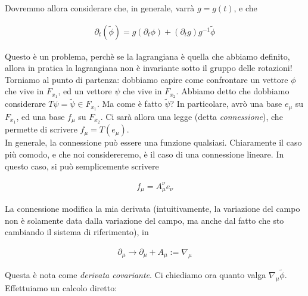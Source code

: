 \documentclass{report}
\begin{document}

Dovremmo allora considerare che, in generale, varrà \(g = g(t)\), e che 

\begin{align}
    \partial_t(\tilde{\phi}) = g(\partial_t\phi) + (\partial_t g)g^{-1}\tilde{\phi}
\end{align}

Questo è un problema, perchè se la lagrangiana è quella che abbiamo definito, allora in pratica la lagrangiana non è invariante sotto il gruppo delle rotazioni! \\

Torniamo al punto di partenza: dobbiamo capire come confrontare un vettore \(\phi\) che vive in \(F_{x_1}\), ed un vettore \(\psi\) che vive in \(F_{x_2}\). Abbiamo detto che dobbiamo considerare \(T \psi = \tilde{\psi} \in F_{x_1}\). Ma come è fatto \(\tilde{\psi}\)? In particolare, avrò una base \(e_{\mu}\) su \(F_{x_1}\), ed una base \(f_\mu\) su \(F_{x_2}\). Ci sarà allora una legge (detta \emph{connessione}), che permette di scrivere \(f_{\mu} = T(e_\mu)\). \\

In generale, la connessione può essere una funzione qualsiasi. Chiaramente il caso più comodo, e che noi considereremo, è il caso di una connessione lineare. In questo caso, si può semplicemente scrivere 

\begin{align}
    f_{\mu} = A^\nu_\mu e_\nu
\end{align}

La connessione modifica la mia derivata (intuitivamente, la variazione del campo non è solamente data dalla variazione del campo, ma anche dal fatto che sto cambiando il sistema di riferimento), in 

\begin{align}
    \partial_\mu \rightarrow \partial_\mu + A_\mu := \nabla_\mu
\end{align}

Questa è nota come \emph{derivata covariante}. Ci chiediamo ora quanto valga \(\nabla_\mu \tilde{\phi}\). Effettuiamo un calcolo diretto: 
\end{document}
